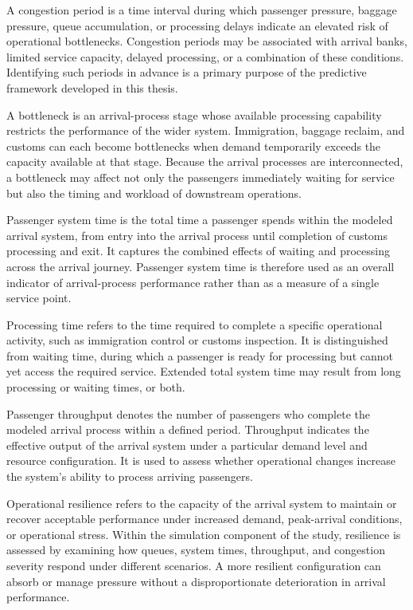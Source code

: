 A congestion period is a time interval during which passenger pressure, baggage pressure, queue accumulation, or processing delays indicate an elevated risk of operational bottlenecks. Congestion periods may be associated with arrival banks, limited service capacity, delayed processing, or a combination of these conditions. Identifying such periods in advance is a primary purpose of the predictive framework developed in this thesis.

A bottleneck is an arrival-process stage whose available processing capability restricts the performance of the wider system. Immigration, baggage reclaim, and customs can each become bottlenecks when demand temporarily exceeds the capacity available at that stage. Because the arrival processes are interconnected, a bottleneck may affect not only the passengers immediately waiting for service but also the timing and workload of downstream operations.

Passenger system time is the total time a passenger spends within the modeled arrival system, from entry into the arrival process until completion of customs processing and exit. It captures the combined effects of waiting and processing across the arrival journey. Passenger system time is therefore used as an overall indicator of arrival-process performance rather than as a measure of a single service point.

Processing time refers to the time required to complete a specific operational activity, such as immigration control or customs inspection. It is distinguished from waiting time, during which a passenger is ready for processing but cannot yet access the required service. Extended total system time may result from long processing or waiting times, or both.

Passenger throughput denotes the number of passengers who complete the modeled arrival process within a defined period. Throughput indicates the effective output of the arrival system under a particular demand level and resource configuration. It is used to assess whether operational changes increase the system's ability to process arriving passengers.

Operational resilience refers to the capacity of the arrival system to maintain or recover acceptable performance under increased demand, peak-arrival conditions, or operational stress. Within the simulation component of the study, resilience is assessed by examining how queues, system times, throughput, and congestion severity respond under different scenarios. A more resilient configuration can absorb or manage pressure without a disproportionate deterioration in arrival performance.

